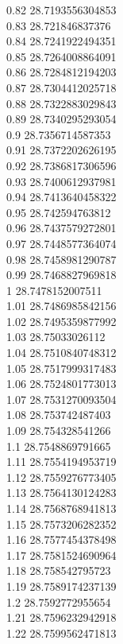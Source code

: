 {0.82	28.7193556304853\\
0.83	28.721846837376\\
0.84	28.7241922494351\\
0.85	28.7264008864091\\
0.86	28.7284812194203\\
0.87	28.7304412025718\\
0.88	28.7322883029843\\
0.89	28.7340295293054\\
0.9	28.7356714587353\\
0.91	28.7372202626195\\
0.92	28.7386817306596\\
0.93	28.7400612937981\\
0.94	28.7413640458322\\
0.95	28.742594763812\\
0.96	28.7437579272801\\
0.97	28.7448577364074\\
0.98	28.7458981290787\\
0.99	28.7468827969818\\
1	28.7478152007511\\
1.01	28.7486985842156\\
1.02	28.7495359877992\\
1.03	28.75033026112\\
1.04	28.7510840748312\\
1.05	28.7517999317483\\
1.06	28.7524801773013\\
1.07	28.7531270093504\\
1.08	28.753742487403\\
1.09	28.754328541266\\
1.1	28.7548869791665\\
1.11	28.7554194953719\\
1.12	28.7559276773405\\
1.13	28.7564130124283\\
1.14	28.7568768941813\\
1.15	28.7573206282352\\
1.16	28.7577454378498\\
1.17	28.7581524690964\\
1.18	28.758542795723\\
1.19	28.7589174237139\\
1.2	28.7592772955654\\
1.21	28.7596232942918\\
1.22	28.7599562471813\\
}

